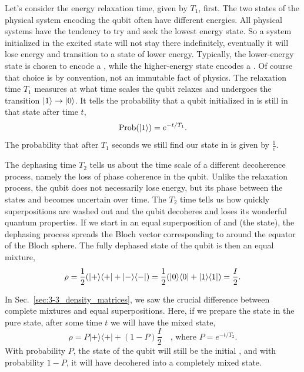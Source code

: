 Let's consider the energy relaxation time, given by $T_1$, first.
The two states of the physical system encoding the qubit often have different energies.
All physical systems have the tendency to try and seek the lowest energy state.
So a system initialized in the excited state will not stay there indefinitely, eventually it will lose energy and transition to a state of lower energy.
Typically, the lower-energy state is chosen to encode a , while the higher-energy state encodes a .
Of course that choice is by convention, not an immutable fact of physics.
The relaxation time $T_1$ measures at what time scales the qubit relaxes and undergoes the transition $\left| 1 \right\rangle\rightarrow\left| 0 \right\rangle$.
It tells the probability that a qubit initialized in  is still in that state after time $t$,
\begin{equation}
    \operatorname{Prob}(\left| 1 \right\rangle)=e^{-t / T_1}.
\end{equation}
The probability that after $T_1$ seconds we still find our state in  is given by $\frac{1}{e}$.

The dephasing time $T_2$ tells us about the time scale of a different decoherence process, namely the loss of phase coherence in the qubit.
Unlike the relaxation process, the qubit does not necessarily lose energy, but its phase between the states  and  becomes uncertain over time.
The $T_2$ time tells us how quickly superpositions are washed out and the qubit decoheres and loses its wonderful quantum properties.
If we start in an equal superposition of  and  (the \ket{+} state), the dephasing process spreads the Bloch vector corresponding to \ket{+} around the equator of the Bloch sphere.
The fully dephased state of the qubit is then an equal mixture,
\begin{equation}
    \rho = \frac{1}{2} ( |+ \rangle \langle +|+|- \rangle \langle -| ) = \frac{1}{2} ( |0 \rangle \langle 0|+|1 \rangle \langle 1| ) = \frac{I}{2}.
\end{equation}

In Sec.~\ref{sec:3-3_density_matrices}, we saw the crucial difference between complete mixtures and equal superpositions. Here, if we prepare the state in the pure state, after some time $t$ we will have the mixed state,
\begin{equation}
    \rho = P |+\rangle\langle+| + (1-P)\frac{I}{2} \quad \text{, where }  P=e^{-t / T_2}.
\end{equation}
With probability $P$, the state of the qubit will still be the initial \ket{+}, and with probability $1-P$, it will have decohered into a completely mixed state.

